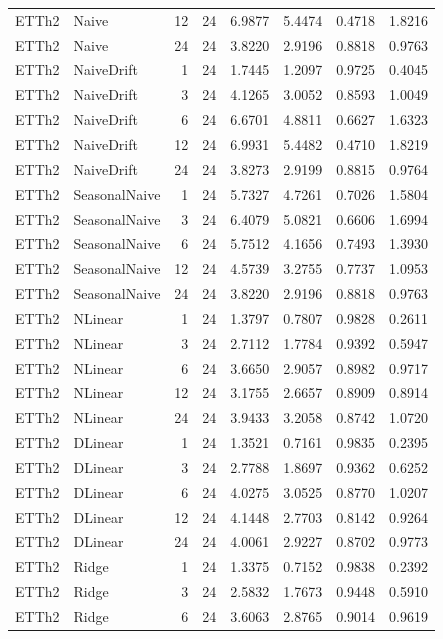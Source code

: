 \begin{tabular}{llrrrrrr}
ETTh2 & Naive & 12 & 24 & 6.9877 & 5.4474 & 0.4718 & 1.8216 \\
ETTh2 & Naive & 24 & 24 & 3.8220 & 2.9196 & 0.8818 & 0.9763 \\
ETTh2 & NaiveDrift & 1 & 24 & 1.7445 & 1.2097 & 0.9725 & 0.4045 \\
ETTh2 & NaiveDrift & 3 & 24 & 4.1265 & 3.0052 & 0.8593 & 1.0049 \\
ETTh2 & NaiveDrift & 6 & 24 & 6.6701 & 4.8811 & 0.6627 & 1.6323 \\
ETTh2 & NaiveDrift & 12 & 24 & 6.9931 & 5.4482 & 0.4710 & 1.8219 \\
ETTh2 & NaiveDrift & 24 & 24 & 3.8273 & 2.9199 & 0.8815 & 0.9764 \\
ETTh2 & SeasonalNaive & 1 & 24 & 5.7327 & 4.7261 & 0.7026 & 1.5804 \\
ETTh2 & SeasonalNaive & 3 & 24 & 6.4079 & 5.0821 & 0.6606 & 1.6994 \\
ETTh2 & SeasonalNaive & 6 & 24 & 5.7512 & 4.1656 & 0.7493 & 1.3930 \\
ETTh2 & SeasonalNaive & 12 & 24 & 4.5739 & 3.2755 & 0.7737 & 1.0953 \\
ETTh2 & SeasonalNaive & 24 & 24 & 3.8220 & 2.9196 & 0.8818 & 0.9763 \\
ETTh2 & NLinear & 1 & 24 & 1.3797 & 0.7807 & 0.9828 & 0.2611 \\
ETTh2 & NLinear & 3 & 24 & 2.7112 & 1.7784 & 0.9392 & 0.5947 \\
ETTh2 & NLinear & 6 & 24 & 3.6650 & 2.9057 & 0.8982 & 0.9717 \\
ETTh2 & NLinear & 12 & 24 & 3.1755 & 2.6657 & 0.8909 & 0.8914 \\
ETTh2 & NLinear & 24 & 24 & 3.9433 & 3.2058 & 0.8742 & 1.0720 \\
ETTh2 & DLinear & 1 & 24 & 1.3521 & 0.7161 & 0.9835 & 0.2395 \\
ETTh2 & DLinear & 3 & 24 & 2.7788 & 1.8697 & 0.9362 & 0.6252 \\
ETTh2 & DLinear & 6 & 24 & 4.0275 & 3.0525 & 0.8770 & 1.0207 \\
ETTh2 & DLinear & 12 & 24 & 4.1448 & 2.7703 & 0.8142 & 0.9264 \\
ETTh2 & DLinear & 24 & 24 & 4.0061 & 2.9227 & 0.8702 & 0.9773 \\
ETTh2 & Ridge & 1 & 24 & 1.3375 & 0.7152 & 0.9838 & 0.2392 \\
ETTh2 & Ridge & 3 & 24 & 2.5832 & 1.7673 & 0.9448 & 0.5910 \\
ETTh2 & Ridge & 6 & 24 & 3.6063 & 2.8765 & 0.9014 & 0.9619 \\

\end{tabular}
